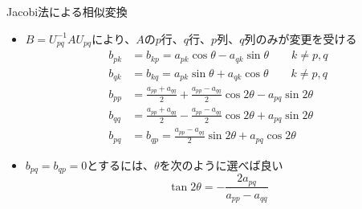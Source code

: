 \begin{frame}[t,fragile]{Jacobi法による相似変換}
  \begin{itemize}
  \item $B=U_{pq}^{-1} A U_{pq}$により、$A$の$p$行、$q$行、$p$列、$q$列のみが変更を受ける
    \begin{align*}
      b_{pk} &= b_{kp} = a_{pk} \cos \theta - a_{qk} \sin \theta \qquad k \ne p,q \\
      b_{qk} &= b_{kq} = a_{pk} \sin \theta + a_{qk} \cos \theta \qquad k \ne p,q \\
      b_{pp} &= \frac{a_{pp}+a_{qq}}{2} + \frac{a_{pp}-a_{qq}}{2} \cos 2 \theta - a_{pq} \sin 2 \theta \\
      b_{qq} &= \frac{a_{pp}+a_{qq}}{2} - \frac{a_{pp}-a_{qq}}{2} \cos 2 \theta + a_{pq} \sin 2 \theta \\
      b_{pq} &= b_{qp} = \frac{a_{pp}-a_{qq}}{2} \sin 2 \theta + a_{pq} \cos 2 \theta
    \end{align*}
  \item $b_{pq} = b_{qp} = 0$とするには、$\theta$を次のように選べば良い
    \[
    \tan 2 \theta = - \frac{2 a_{pq}}{a_{pp}-a_{qq}}
    \]
  \end{itemize}
\end{frame}
